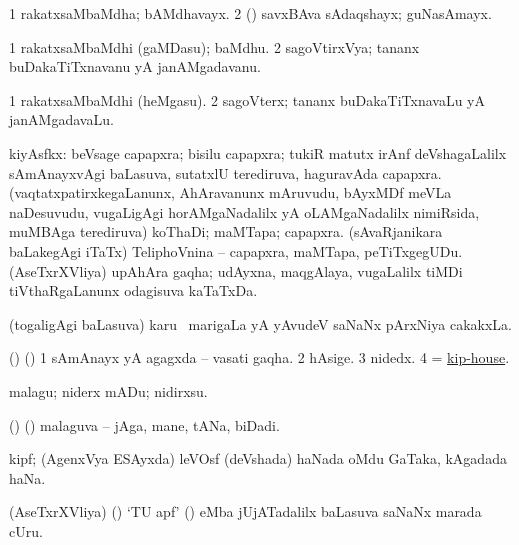 \bentry
{}
\gl{\nA}
\bmng
\bnum
\num{1} rakatxsaMbaMdha; bAMdhavayx. 
\num{2} (\rUpa) savxBAva sAdaqshayx; guNasAmayx. 
\enum
\emng
\eentry

\bentry
{}
\gl{\nA}
\bmng
\bnum
\num{1} rakatxsaMbaMdhi (gaMDasu); baMdhu. 
\num{2} sagoVtirxVya; tananx buDakaTiTxnavanu yA janAMgadavanu. 
\enum
\emng
\eentry

\bentry
{}
\gl{\nA}
\bmng
\bnum
\num{1} rakatxsaMbaMdhi (heMgasu). 
\num{2} sagoVterx; tananx buDakaTiTxnavaLu yA janAMgadavaLu. 
\enum
\emng
\eentry

\bentry
{}
\gl{\nA}
\bmng
kiyAsfkx: 
\banum
{} beVsage capapxra; bisilu capapxra; tukiR matutx irAnf deVshagaLalilx sAmAnayxvAgi baLasuva, sutatxlU terediruva, haguravAda capapxra.  
 (vaqtatxpatirxkegaLanunx, AhAravanunx mAruvudu, bAyxMDf meVLa naDesuvudu, \mo vugaLigAgi horAMgaNadalilx yA oLAMgaNadalilx nimiRsida, muMBAga terediruva) koThaDi; maMTapa; capapxra. 
 (sAvaRjanikara baLakegAgi iTaTx) TeliphoVnina -- capapxra, maMTapa, peTiTxgegUDu. 
 (AseTxrXVliya) upAhAra gaqha; udAyxna, maqgAlaya, \mo vugaLalilx tiMDi tiVthaRgaLanunx odagisuva kaTaTxDa. 
\eanum
\emng
\eentry

\bentry
{}
\gl{\nA}
\bmng
(togaligAgi baLasuva) karu \mo\ marigaLa yA yAvudeV saNaNx pArxNiya cakakxLa. 
\emng
\eentry

\bentry
{}
\gl{\nA}
\bmng
(\birx) (\ashi) 
\bnum
\num{1} sAmAnayx yA agagxda -- vasati gaqha. 
\num{2} hAsige. 
\num{3} nidedx. 
\num{4} = \hyperlink{kip-house}{kip-house}. 
\enum
\emng
\eentry

\bentry
{}
\gl{\akirx}
\bmng
malagu; niderx mADu; nidirxsu. 
\emng
\eentry

\bentry
{}
\gl{\nA}
\bmng
(\birx) (\ashi) malaguva -- jAga, mane, tANa, biDadi. 
\emng
\eentry

\bentry
{}
\gl{\nA}
\bmng
kipf; (AgenxVya ESAyxda) leVOsf (deVshada) haNada oMdu GaTaka, kAgadada haNa. 
\emng
\eentry

\bentry
{}
\gl{\nA}
\bmng
(AseTxrXVliya) (\ashi) `TU apf' () eMba jUjATadalilx baLasuva saNaNx marada cUru. 
\emng
\eentry

